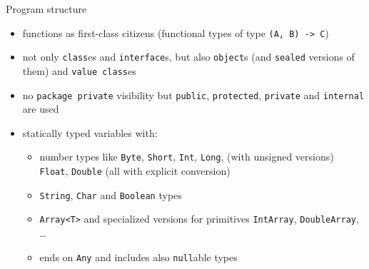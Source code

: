 \documentclass[hyperref={pdfpagelabels=false},xcolor={dvipsnames},compress]{beamer}
\begin{document}
    \begin{frame}{Program structure}
        \begin{itemize}
            \item functions as first-class citizens (functional types of type \texttt{(A, B) -> C}) \pause
            \item not only \texttt{class}es and \texttt{interface}s, but also \texttt{object}s (and \texttt{sealed} versions of them) and \texttt{value class}es \pause
            \item no \texttt{package private} visibility but \texttt{public}, \texttt{protected}, \texttt{private} and \texttt{internal} are used \pause
            \item statically typed variables with: \pause
            \begin{itemize}
                \item number types like \texttt{Byte}, \texttt{Short}, \texttt{Int}, \texttt{Long}, (with unsigned versions) \texttt{Float}, \texttt{Double} (all with explicit conversion) \pause
                \item \texttt{String}, \texttt{Char} and \texttt{Boolean} types \pause
                \item \texttt{Array<T>} and specialized versions for primitives \texttt{IntArray}, \texttt{DoubleArray}, \ldots \pause
                \item ends on \texttt{Any} and includes also \texttt{null}able types
            \end{itemize}
        \end{itemize}
    \end{frame}
\end{document}
